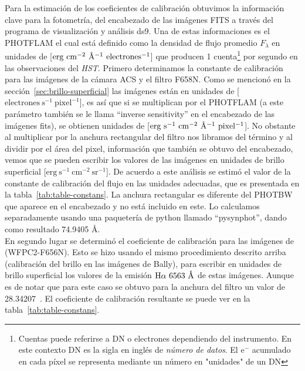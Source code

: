  Para la estimación de los coeficientes de calibración obtuvimos la información clave para la fotometría, del encabezado de las imágenes FITS a través del programa de visualización y análisis ds9. Una de estas informaciones es el PHOTFLAM el cual está definido como la densidad de flujo promedio \(F_{\lambda}\) en unidades de [\(\mathrm{erg~cm^{-2}~\text{\AA{}}{}^{-1}~electrones^{-1}}\)] que producen 1 cuenta\footnote{Cuentas puede referirse a DN o electrones dependiendo del instrumento. En este contexto DN es la sigla en inglés de \textit{número de datos}. El \(\mathrm{e^{-}}\) acumulado en cada píxel se representa mediante un número en "unidades" de un DN } por segundo en las observaciones del \textit{HST}. Primero determinamos la constante de calibración para las imágenes de la cámara ACS y el filtro F658N. Como se mencionó en la sección~\ref{sec:brillo-superficial} las imágenes están en unidades de [\(\mathrm{electrones~s^{-1}~pixel^{-1}}\)], es así que si se multiplican por el PHOTFLAM (a este parámetro también se le llama ``inverse sensitivity'' en el encabezado de las imágenes fits), se obtienen unidades de [\(\mathrm{erg\ s^{-1}~cm^{-2}~\A{}^{-1}~pixel^{-1}}\)]. No obstante al multiplicar por la anchura rectangular del filtro nos libramos del término \A{} y al dividir por el área del pixel, información que también se obtuvo del encabezado, vemos que se pueden escribir los valores de las imágenes en unidades de brillo superficial [\(\mathrm{erg~s^{-1}~cm^{-2}~sr^{-1}}\)]. De acuerdo a este análisis se estimó el valor de la constante de calibración del flujo en las unidades adecuadas, que es presentada en la tabla~\ref{tab:table-constans}. La anchura rectangular es diferente del PHOTBW que aparece en el encabezado y no está incluido en este. Lo calculamos separadamente usando una paquetería de python llamado ``pysynphot'', dando como resultado 74.9405 \(\text{\AA{}}\).\\

En segundo lugar se determinó el coeficiente de calibración  para las imágenes de \citet{Robberto:2013a} (WFPC2-F656N). Esto se hizo usando el mismo procedimiento descrito arriba (calibración del brillo en las imágenes de Bally), para escribir en unidades de brillo superficial los valores de la emisión \(\mathrm{H}\alpha{}~6563~\text{\AA{}}{}\) de estas imágenes. Aunque es de notar que para este caso se obtuvo para la anchura del filtro un valor de 28.34207~\A{}. El coeficiente de calibración resultante se puede ver en la tabla~\ref{tab:table-constans}.\\

